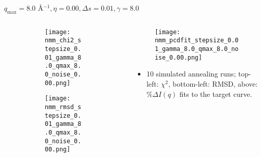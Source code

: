 \documentclass{beamer}
\begin{document}
\begin{frame}{$ q_{\textrm{max}}=8.0 $ \AA $^{-1}, \eta=0.00, \Delta s=0.01, \gamma=8.0$}
	\begin{columns}
		\begin{column}{.5\textwidth}
			\begin{figure}[H]
			\centering
			\begin{subfigure}[b]{\textwidth}
				\centering
				\texttt{[image: nmm\_chi2\_stepsize\_0.01\_gamma\_8.0\_qmax\_8.0\_noise\_0.00.png]}
				\label{fig:}
			\end{subfigure}
			\begin{subfigure}[b]{\textwidth}
				\centering
				\texttt{[image: nmm\_rmsd\_stepsize\_0.01\_gamma\_8.0\_qmax\_8.0\_noise\_0.00.png]}
				\label{fig:}
			\end{subfigure}
			\end{figure}
		\end{column}
		\begin{column}{.5\textwidth}
			\begin{figure}[H]
				\centering
				\texttt{[image: nmm\_pcdfit\_stepsize\_0.01\_gamma\_8.0\_qmax\_8.0\_noise\_0.00.png]}
				\label{fig:}
			\end{figure}
			\begin{itemize}
				\item 10 simulated annealing runs; top-left: $\chi^2$, bottom-left: RMSD, above: $\%\Delta I(q)$ fits to the target curve.
			\end{itemize}
		\end{column}
	\end{columns}
\end{frame}
 
\end{document}
